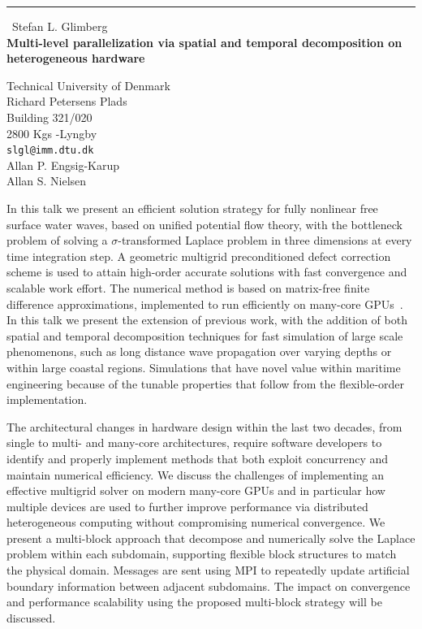 \documentclass{report}
\begin{document}
\begin{center}
\rule{6in}{1pt} \
{\large Stefan L. Glimberg \\
{\bf Multi-level parallelization via spatial and temporal decomposition on heterogeneous hardware}}

Technical University of Denmark \\ Richard Petersens Plads \\ Building 321/020 \\ 2800 Kgs -Lyngby
\\
{\tt slgl@imm.dtu.dk}\\
Allan P. Engsig-Karup\\
Allan S. Nielsen\end{center}

In this talk we present an efficient solution strategy for fully
nonlinear free surface water waves, based on unified potential flow
theory, with the bottleneck problem of solving a $\sigma$-transformed
Laplace problem in three dimensions at every time integration step. A
geometric multigrid preconditioned defect correction scheme is used to
attain high-order accurate solutions with fast convergence and scalable
work effort. The numerical method is based on matrix-free finite
difference approximations, implemented to run efficiently on many-core
GPUs~\cite{EngsigKarupEtAl2011,GlimbergEtAl2011}. In this talk we present
the extension of previous work, with the addition of both spatial and
temporal decomposition techniques for fast simulation of large scale
phenomenons, such as long distance wave propagation over varying depths
or within large coastal regions. Simulations that have novel value within
maritime engineering because of the tunable properties that follow from
the flexible-order implementation.

The architectural changes in hardware design within the last two decades,
from single to multi- and many-core architectures, require software
developers to identify and properly implement methods that both exploit
concurrency and maintain numerical efficiency. We discuss the challenges
of implementing an effective multigrid solver on modern many-core GPUs
and in particular how multiple devices are used to further improve
performance via distributed heterogeneous computing without compromising
numerical convergence. We present a multi-block approach that decompose
and numerically solve the Laplace problem within each subdomain,
supporting flexible block structures to match the physical domain.
Messages are sent using MPI to repeatedly update artificial boundary
information between adjacent subdomains. The impact on convergence and
performance scalability using the proposed multi-block strategy will be
discussed.
\end{document}
